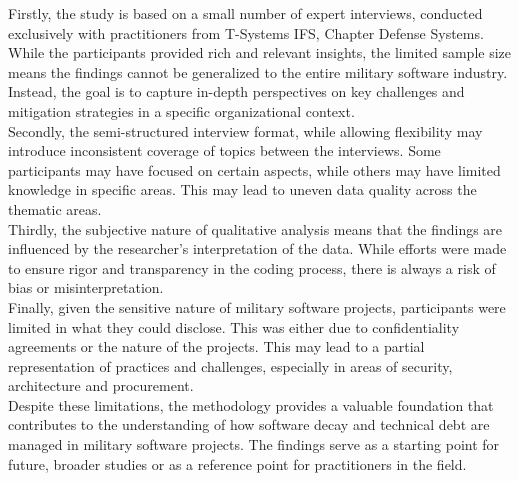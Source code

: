 Firstly, the study is based on a small number of expert interviews, conducted exclusively with practitioners from T-Systems IFS, Chapter Defense Systems. While the participants provided rich and relevant insights, the limited sample size means the findings cannot be generalized to the entire military software industry. 
Instead, the goal is to capture in-depth perspectives on key challenges and mitigation strategies in a specific organizational context.\\

Secondly, the semi-structured interview format, while allowing flexibility may introduce inconsistent coverage of topics between the interviews. Some participants may have focused on certain aspects, while others may have limited knowledge in specific areas. This may lead to uneven data quality across the thematic areas.\\

Thirdly, the subjective nature of qualitative analysis means that the findings are influenced by the researcher's interpretation of the data. While efforts were made to ensure rigor and transparency in the coding process, there is always a risk of bias or misinterpretation.\\

Finally, given the sensitive nature of military software projects, participants were limited in what they could disclose. This was either due to confidentiality agreements or the nature of the projects. This may lead to a partial representation of practices and challenges, especially in areas of security, architecture and procurement.\\

Despite these limitations, the methodology provides a valuable foundation that contributes to the understanding of how software decay and technical debt are managed in military software projects. The findings serve as a starting point for future, broader studies or as a reference point for practitioners in the field.\\